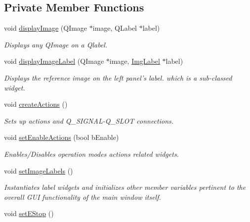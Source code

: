 \subsection*{Private Member Functions}
\begin{DoxyCompactItemize}
\item 
void \hyperlink{classQcorr_a925b0715143a0afa981851547f8b9256}{displayImage} (QImage $\ast$image, QLabel $\ast$label)
\begin{DoxyCompactList}\small\item\em Displays any QImage on a Qlabel. \item\end{DoxyCompactList}\item 
void \hyperlink{classQcorr_afddb022a6024a32be3b47016308d6c50}{displayImageLabel} (QImage $\ast$image, \hyperlink{classImgLabel}{ImgLabel} $\ast$label)
\begin{DoxyCompactList}\small\item\em Displays the reference image on the left panel's label. which is a sub-\/classed widget. \item\end{DoxyCompactList}\item 
\hypertarget{classQcorr_a54af608880477563fa8ebcb0d066b447}{
void \hyperlink{classQcorr_a54af608880477563fa8ebcb0d066b447}{createActions} ()}
\label{classQcorr_a54af608880477563fa8ebcb0d066b447}

\begin{DoxyCompactList}\small\item\em Sets up actions and Q\_\-SIGNAL-\/Q\_\-SLOT connections. \item\end{DoxyCompactList}\item 
void \hyperlink{classQcorr_a2de6d6969bdf48b225acc5ebbae063f7}{setEnableActions} (bool bEnable)
\begin{DoxyCompactList}\small\item\em Enables/Disables operation modes actions related widgets. \item\end{DoxyCompactList}\item 
\hypertarget{classQcorr_a17beb7cf946cdd82f587e3b4e5ee7f19}{
void \hyperlink{classQcorr_a17beb7cf946cdd82f587e3b4e5ee7f19}{setImageLabels} ()}
\label{classQcorr_a17beb7cf946cdd82f587e3b4e5ee7f19}

\begin{DoxyCompactList}\small\item\em Instantiates label widgets and initializes other member variables pertinent to the overall GUI functionality of the main window itself. \item\end{DoxyCompactList}\item 
\hypertarget{classQcorr_a6d6b50dbf553c37218aed1faaf147c55}{
void \hyperlink{classQcorr_a6d6b50dbf553c37218aed1faaf147c55}{setEStop} ()}
\label{classQcorr_a6d6b50dbf553c37218aed1faaf147c55}


\end{DoxyCompactItemize}
